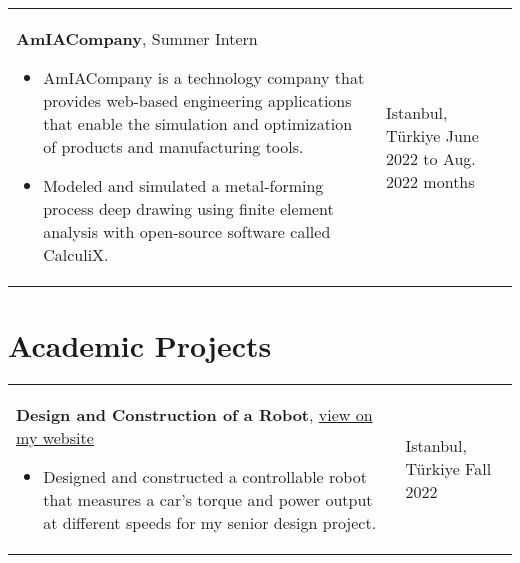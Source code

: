 \documentclass[10pt, a4paper]{article}
\newenvironment{highlights}{
        \begin{itemize}[
                topsep=0pt,
                parsep=0.07 cm,
                partopsep=0pt,
                itemsep=0pt,
                after=\vspace{-1\baselineskip},
                leftmargin=0.6 cm + 3pt
            ]
    }{
        \end{itemize}
    } %
\let\hrefWithoutArrow\href
\renewcommand{\href}[2]{\hrefWithoutArrow{#1}{#2 \raisebox{.15ex}{\footnotesize \faExternalLink*}}}
\begin{document}
        \vspace{0.12 cm}
        \begin{tabularx}{ cm-0.13cm}{K{0.2 cm} R{3.6 cm}}
            \textbf{AmIACompany}, Summer Intern
            \vspace{0.12 cm}
            \begin{highlights}
                \item AmIACompany is a technology company that provides web-based engineering applications that enable the simulation and optimization of products and manufacturing tools. 
                \item Modeled and simulated a metal-forming process deep drawing using finite element analysis with open-source software called CalculiX. \hspace*{-0.2cm}
            \end{highlights}
        &
            Istanbul, Türkiye \newline
            June 2022 to Aug. 2022  months
        \end{tabularx}



    \section{Academic Projects}
    
        \begin{tabularx}{ cm-0.13cm}{K{0.2 cm} R{3.6 cm}}
            \textbf{Design and Construction of a Robot}, \href{https://example.com/}{view on my website}
            \vspace{0.12 cm}
            \begin{highlights}
                \item Designed and constructed a controllable robot that measures a car's torque and power output at different speeds for my senior design project. \hspace*{-0.2cm}
            \end{highlights}
        &
            Istanbul, Türkiye \newline
            Fall 2022
        \end{tabularx}
\end{document}
